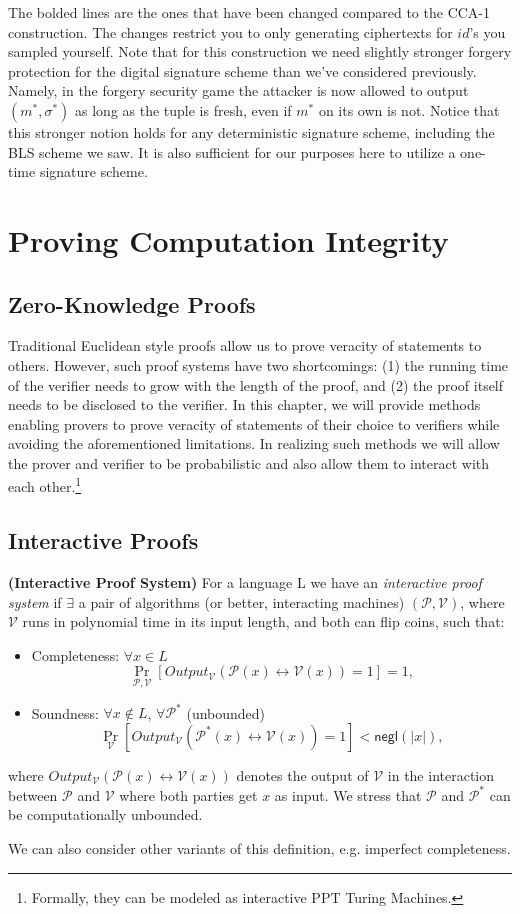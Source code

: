 \documentclass[12pt]{tufte-book}
\begin{document}
The bolded lines are the ones that have been changed compared to the CCA-1 construction. 
The changes restrict you to only generating ciphertexts for $id$'s you sampled yourself. 
Note that for this construction we need slightly stronger forgery protection for the digital signature scheme than we've considered previously. 
Namely, in the forgery security game the attacker is now allowed to output $(m^*, \sigma^*)$ as long as the tuple is fresh, even if $m^*$ on its own is not. 
Notice that this stronger notion holds for any deterministic signature scheme, including the BLS scheme we saw. 
It is also sufficient for our purposes here to utilize a one-time signature scheme.  \chapter{Proving Computation Integrity}
\section{Zero-Knowledge Proofs}
Traditional Euclidean style proofs allow us to prove veracity of statements to others. However, such proof systems have two shortcomings: (1) the running time of the verifier needs to grow with the length of the proof, and (2) the proof itself needs to be disclosed to the verifier. In this chapter, we will provide methods enabling provers to prove veracity of statements of their choice to verifiers while avoiding the aforementioned limitations. In realizing such methods we will allow the prover and verifier to be probabilistic and also allow them to interact with each other.\footnote{Formally, they can be modeled as interactive PPT Turing Machines.}

\section{Interactive Proofs}
\begin{definition} {\normalfont\textbf{(Interactive Proof System)}} For a language L we have an \textit{interactive proof system} if $\exists$ a pair of algorithms (or better, interacting machines) $(\mathcal{P},\mathcal{V})$, where $\mathcal{V}$ runs in polynomial time in its input length, and both can flip coins, such that:
		\begin{itemize}
			\item Completeness: $\forall x\in L$
		$$\Pr_{\mathcal{P},\mathcal{V}} \left[Output_{\mathcal{V}}(\mathcal{P}(x) \leftrightarrow \mathcal{V}(x))=1\right]=1,$$
			\item Soundness: $\forall x\notin L$, $\forall \mathcal{P}^*$ (unbounded)
		$$\Pr_{\mathcal{V}} \left[Output_{\mathcal{V}}(\mathcal{P}^*(x) \leftrightarrow \mathcal{V}(x))=1\right]<\mathsf{negl}(|x|),$$
		\end{itemize} where $Output_{\mathcal{V}}(\mathcal{P}(x) \leftrightarrow \mathcal{V}(x))$ denotes the output of $\mathcal{V}$ in the interaction between $\mathcal{P}$ and $\mathcal{V}$ where both parties get $x$ as input.
		We stress that $\mathcal{P}$ and $\mathcal{P}^*$ can be computationally unbounded. 
  \end{definition}
We can also consider other variants of this definition, e.g. imperfect completeness.
\end{document}
